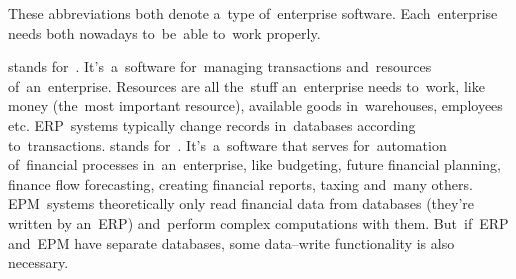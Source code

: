 These abbreviations both denote a~type of~enterprise software.
Each~enterprise needs both nowadays to~be~able to~work properly.
\begin{itemize}
     stands for~.
            It's~a~software for~managing transactions and~resources of~an~enterprise.
            Resources are all the~stuff an~enterprise needs to~work, like money (the~most important resource), available goods in~warehouses, employees etc.
            ERP~systems typically change records in~databases according to~transactions.
     stands for~.
            It's~a~software that serves for~automation of~financial processes in~an~enterprise, like budgeting, future financial planning, finance flow forecasting, creating financial reports, taxing and~many others.
            EPM~systems theoretically only read financial data from databases (they're written by an~ERP) and~perform complex computations with them.
            But~if~ERP and~EPM have separate databases, some data--write functionality is also necessary.
\end{itemize}
